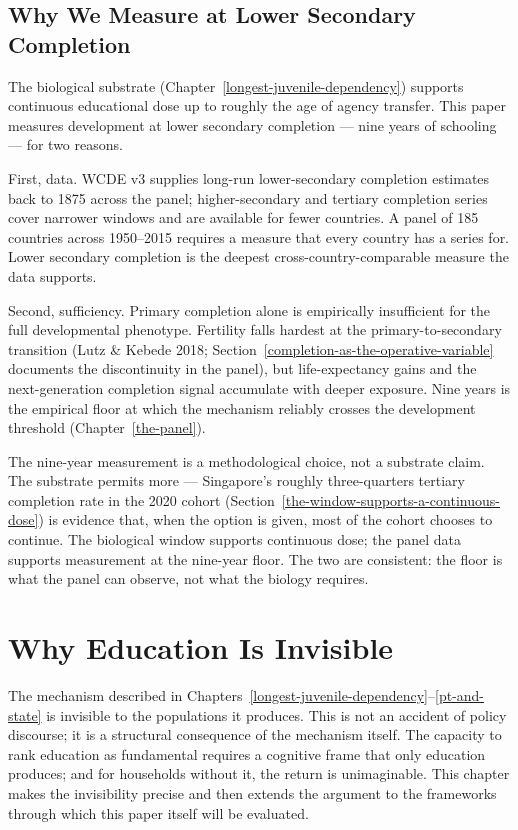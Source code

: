 \documentclass[12pt,letterpaper]{article}
\begin{document}
\subsection{Why We Measure at Lower Secondary Completion}\label{nine-year-measurement}

The biological substrate (Chapter~\ref{longest-juvenile-dependency})
supports continuous educational dose up to roughly the age of agency
transfer. This paper measures development at lower secondary
completion --- nine years of schooling --- for two reasons.

First, data. WCDE v3 supplies long-run lower-secondary completion
estimates back to 1875 across the panel; higher-secondary and
tertiary completion series cover narrower windows and are available
for fewer countries. A panel of 185 countries across 1950--2015
requires a measure that every country has a series for. Lower
secondary completion is the deepest cross-country-comparable measure
the data supports.

Second, sufficiency. Primary completion alone is empirically
insufficient for the full developmental phenotype. Fertility falls
hardest at the primary-to-secondary transition (Lutz \& Kebede 2018;
Section~\ref{completion-as-the-operative-variable} documents the
discontinuity in the panel), but life-expectancy gains and the
next-generation completion signal accumulate with deeper exposure.
Nine years is the empirical floor at which the mechanism reliably
crosses the development threshold
(Chapter~\ref{the-panel}).

The nine-year measurement is a methodological choice, not a substrate
claim. The substrate permits more --- Singapore's roughly
three-quarters tertiary completion rate in the 2020 cohort
(Section~\ref{the-window-supports-a-continuous-dose}) is evidence
that, when the option is given, most of the cohort chooses to
continue. The biological window supports continuous dose; the panel
data supports measurement at the nine-year floor. The two are
consistent: the floor is what the panel can observe, not what the
biology requires.

\section{Why Education Is Invisible}\label{why-education-is-invisible}

The mechanism described in Chapters~\ref{longest-juvenile-dependency}--\ref{pt-and-state}
is invisible to the populations it produces. This is not an accident
of policy discourse; it is a structural consequence of the mechanism
itself. The capacity to rank education as fundamental requires a
cognitive frame that only education produces; and for households
without it, the return is unimaginable. This chapter makes the
invisibility precise and then extends the argument to the frameworks
through which this paper itself will be evaluated.
\end{document}
